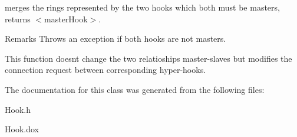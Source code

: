 merges the rings represented by the two hooks which both must be masters, returns {\ttfamily $<$master\+Hook$>$}.

\begin{DoxyRemark}{Remarks}
Throws an exception if both hooks are not masters.
\end{DoxyRemark}
This function doesn\textquotesingle{}t change the two relatioships master-\/slaves but modifies the connection request between corresponding hyper-\/hooks. 

The documentation for this class was generated from the following files\+:\begin{DoxyCompactItemize}
\item 
Hook.\+h\item 
Hook.\+dox\end{DoxyCompactItemize}
